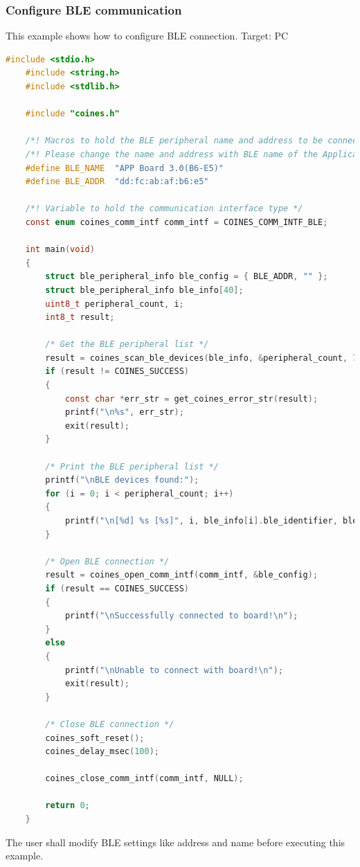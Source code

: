 \documentclass[11pt,headings=small]{scrartcl}
\begin{document}
\subsubsection{Configure BLE communication}\label{bleComConfig}
This example shows how to configure BLE connection.
\newline Target: PC
\begin{lstlisting}[language=c]
	#include <stdio.h>
	#include <string.h>
	#include <stdlib.h>
	
	#include "coines.h"
	
	/*! Macros to hold the BLE peripheral name and address to be connected */
	/*! Please change the name and address with BLE name of the Application board under test */
	#define BLE_NAME  "APP Board 3.0(B6-E5)"
	#define BLE_ADDR  "dd:fc:ab:af:b6:e5"
	
	/*! Variable to hold the communication interface type */
	const enum coines_comm_intf comm_intf = COINES_COMM_INTF_BLE;
	
	int main(void)
	{
		struct ble_peripheral_info ble_config = { BLE_ADDR, "" };
		struct ble_peripheral_info ble_info[40];
		uint8_t peripheral_count, i;
		int8_t result;
	
		/* Get the BLE peripheral list */
		result = coines_scan_ble_devices(ble_info, &peripheral_count, 7000);
		if (result != COINES_SUCCESS)
		{
			const char *err_str = get_coines_error_str(result);
			printf("\n%s", err_str);
			exit(result);
		}
	
		/* Print the BLE peripheral list */
		printf("\nBLE devices found:");
		for (i = 0; i < peripheral_count; i++)
		{
			printf("\n[%d] %s [%s]", i, ble_info[i].ble_identifier, ble_info[i].ble_address);
		}
	
		/* Open BLE connection */
		result = coines_open_comm_intf(comm_intf, &ble_config);
		if (result == COINES_SUCCESS)
		{
			printf("\nSuccessfully connected to board!\n");
		}
		else
		{
			printf("\nUnable to connect with board!\n");
			exit(result);
		}
	
		/* Close BLE connection */
		coines_soft_reset();
		coines_delay_msec(100);
	
		coines_close_comm_intf(comm_intf, NULL);
	
		return 0;
	}	

\end{lstlisting}
The user shall modify BLE settings like address and name before executing this example.
\end{document}
